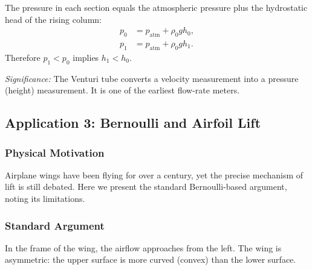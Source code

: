 \documentclass[../main.tex]{subfiles}
\begin{document}
The pressure in each section equals the atmospheric pressure plus the hydrostatic head of the rising column:
\begin{align}
  p_0 &= p_{\mathrm{atm}} + \rho_0 g h_0,\\
  p_1 &= p_{\mathrm{atm}} + \rho_0 g h_1.
\end{align}
Therefore $p_1<p_0$ implies $h_1<h_0$.

\textit{Significance:} The Venturi tube converts a velocity measurement into a pressure (height) measurement. It is one of the earliest flow-rate meters.


\subsection{Application 3: Bernoulli and Airfoil Lift}\label{sec:lec13:lift}

\subsubsection*{Physical Motivation}
Airplane wings have been flying for over a century, yet the precise mechanism of lift is still debated. Here we present the standard Bernoulli-based argument, noting its limitations.

\subsubsection{Standard Argument}
In the frame of the wing, the airflow approaches from the left. The wing is asymmetric: the upper surface is more curved (convex) than the lower surface.
\end{document}
